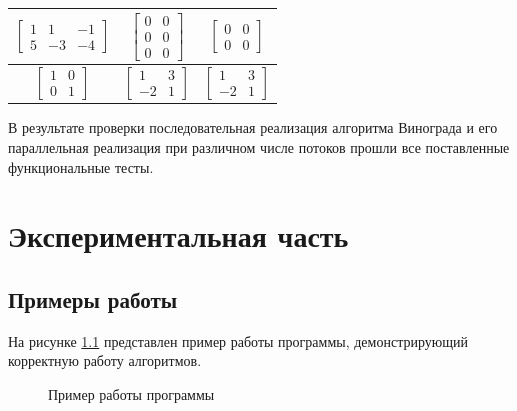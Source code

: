 \documentclass[12pt, a4paper]{report}
\begin{document}
\begin{table}[ht!]
\begin{center}
\begin{tabular}{|c|c|c|}
			$\begin{bmatrix}1 & 1 & -1\\5 & -3 & -4\end{bmatrix}$ &
			$\begin{bmatrix}0 & 0\\0 & 0\\0 & 0\end{bmatrix}$ &
			$\begin{bmatrix}0 & 0\\0 & 0\end{bmatrix}$\\\hline
			
			$\begin{bmatrix}1 & 0\\0 & 1\end{bmatrix}$ &
			$\begin{bmatrix}1 & 3\\-2 & 1\end{bmatrix}$ &
			$\begin{bmatrix}1 & 3\\-2 & 1\end{bmatrix}$\\\hline

			\end{tabular}
		\end{center}
	\end{table}

	В результате проверки последовательная реализация алгоритма Винограда и его параллельная реализация при различном числе потоков прошли все поставленные функциональные тесты.

	\chapter{Экспериментальная часть}
	\section{Примеры работы}
	На рисунке \ref{pic:example} представлен пример работы программы, демонстрирующий корректную работу алгоритмов.
	\begin{figure}[ht!]
		\centering
		\caption{Пример работы программы}
		\label{pic:example}
	\end{figure}
	
\end{document}
